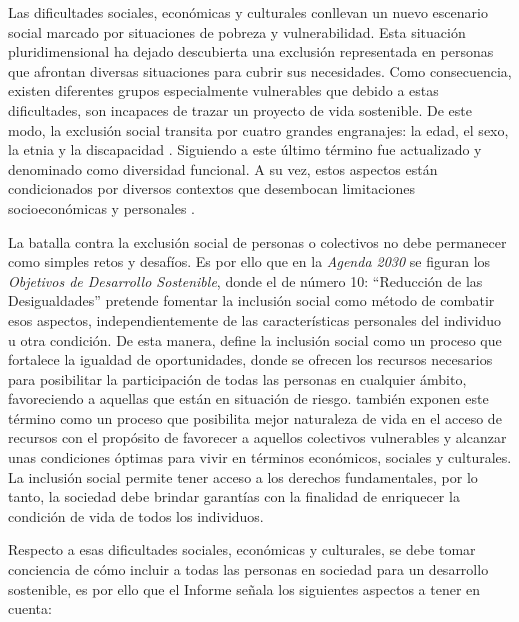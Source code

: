 \documentclass[spanish]{textolivre}
\begin{document}
Las dificultades sociales, económicas y culturales conllevan un nuevo escenario social marcado por situaciones de pobreza y vulnerabilidad. Esta situación pluridimensional ha dejado descubierta una exclusión representada en personas que afrontan diversas situaciones para cubrir sus necesidades. Como consecuencia, existen diferentes grupos especialmente vulnerables que debido a estas dificultades, son incapaces de trazar un proyecto de vida sostenible. De este modo, la exclusión social transita por cuatro grandes engranajes: la edad, el sexo, la etnia y la discapacidad \cite{ministerio_de_sanidad_consumo_y_bienestar_social_estrategia_2019}. Siguiendo a \textcite{fernandez_formacion_2019} este último término fue actualizado y denominado como diversidad funcional. A su vez, estos aspectos están condicionados por diversos contextos que desembocan limitaciones socioeconómicas y personales \cite{padilla_relacion_2021}.

La batalla contra la exclusión social de personas o colectivos no debe permanecer como simples retos y desafíos. Es por ello que en la \textit{Agenda 2030} se figuran los \textit{Objetivos de Desarrollo Sostenible}, donde el de número 10: “Reducción de las Desigualdades” pretende fomentar la inclusión social como método de combatir esos aspectos, independientemente de las características personales del individuo u otra condición. De esta manera, \textcite{perez_inclusion_2020} define la inclusión social como un proceso que fortalece la igualdad de oportunidades, donde se ofrecen los recursos necesarios para posibilitar la participación de todas las personas en cualquier ámbito, favoreciendo a aquellas que están en situación de riesgo. \textcite{padilla_relacion_2021} también exponen este término como un proceso que posibilita mejor naturaleza de vida en el acceso de recursos con el propósito de favorecer a aquellos colectivos vulnerables y alcanzar unas condiciones óptimas para vivir en términos económicos, sociales y culturales. La inclusión social permite tener acceso a los derechos fundamentales, por lo tanto, la sociedad debe brindar garantías con la finalidad de enriquecer la condición de vida de todos los individuos.

Respecto a esas dificultades sociales, económicas y culturales, se debe tomar conciencia de cómo incluir a todas las personas en sociedad para un desarrollo sostenible, es por ello que el Informe \textcite{informe_foessa_sobre_exclusion_y_desarrollo_social_en_espana_viii_2019} señala los siguientes aspectos a tener en cuenta:
\end{document}
